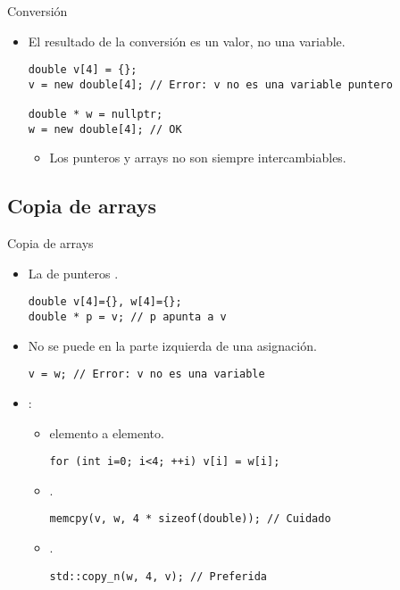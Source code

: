 \begin{frame}[t,fragile]{Conversión}
\begin{itemize}
  \item El resultado de la conversión es un valor, no una variable.
\begin{lstlisting}
double v[4] = {};
v = new double[4]; // Error: v no es una variable puntero

double * w = nullptr;
w = new double[4]; // OK
\end{lstlisting}
    \begin{itemize}
      \item Los punteros y arrays no son siempre intercambiables.
    \end{itemize}
\end{itemize}
\end{frame}

\subsection{Copia de arrays}

\begin{frame}[t,fragile]{Copia de arrays}
\begin{itemize}
  \item La  de punteros .
\begin{lstlisting}
double v[4]={}, w[4]={};
double * p = v; // p apunta a v
\end{lstlisting}

  \item No se puede  
        en la parte izquierda de una asignación.
\begin{lstlisting}
v = w; // Error: v no es una variable
\end{lstlisting}

  \item {}:
    \begin{itemize}
      \item {} elemento a elemento.
\begin{lstlisting}
for (int i=0; i<4; ++i) v[i] = w[i];
\end{lstlisting}
      \item {}.
\begin{lstlisting}
memcpy(v, w, 4 * sizeof(double)); // Cuidado
\end{lstlisting}
      \item {}.
\begin{lstlisting}
std::copy_n(w, 4, v); // Preferida
\end{lstlisting}
    \end{itemize}
\end{itemize}
\end{frame}


